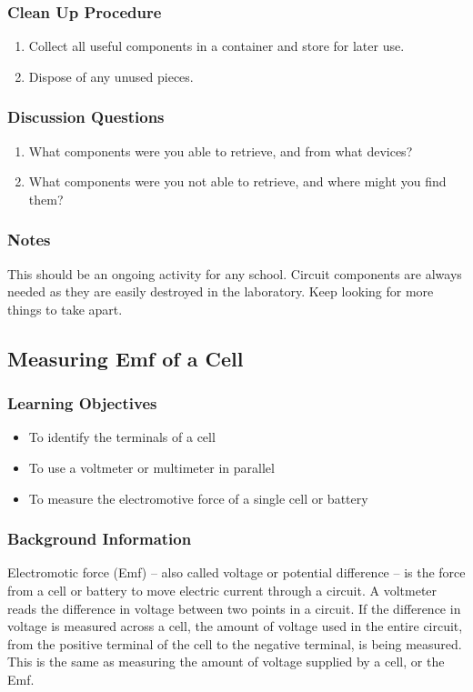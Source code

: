 \subsubsection*{Clean Up Procedure}
\begin{enumerate}
\item{Collect all useful components in a container and store for later use.} 
\item{Dispose of any unused pieces.} 
\end{enumerate}

\subsubsection*{Discussion Questions}
\begin{enumerate}
\item{What components were you able to retrieve, and from what devices?}
\item{What components were you not able to retrieve, and where might you find them?}
\end{enumerate}

\subsubsection*{Notes}
This should be an ongoing activity for any school. Circuit components are always needed as they are easily destroyed in the laboratory. Keep looking for more things to take apart. 

\subsection{Measuring Emf of a Cell}

\subsubsection*{Learning Objectives}
\begin{itemize}
\item{To identify the terminals of a cell} 
\item{To use a voltmeter or multimeter in parallel} 
\item{To measure the electromotive force of a single cell or battery} 
\end{itemize}

\subsubsection*{Background Information}
Electromotic force (Emf) -- also called voltage or potential difference -- is the force from a cell or battery to move electric current through a circuit. A voltmeter reads the difference in voltage between two points in a circuit. If the difference in voltage is measured across a cell, the amount of voltage used in the entire circuit, from the positive terminal of the cell to the negative terminal, is being measured. This is the same as measuring the amount of voltage supplied by a cell, or the Emf. 

